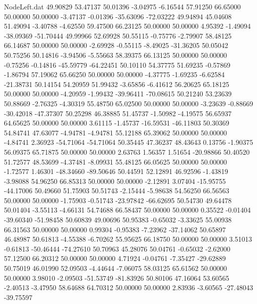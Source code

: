\begin{filecontents}{NodeLeft.dat}
  49.90829   53.47137   50.01396    -3.04975   -6.16544   57.91250   66.65000   50.00000   50.00000   -3.47137   -0.01396  -35.63096  -72.03222
  49.94894   45.04608   51.49094    -3.40788   -4.62550   59.47500   66.23125   50.00000   50.00000    4.95392   -1.49094  -38.09369  -51.70444
  49.99966   52.69928   50.55115    -0.75776   -2.79907   58.48125   66.14687   50.00000   50.00000   -2.69928   -0.55115   -8.49025  -31.36205
  50.05042   50.75256   50.14816    -3.94506   -5.55663   58.39375   66.13125   50.00000   50.00000   -0.75256   -0.14816  -45.59779  -64.22451
  50.10110   54.37775   51.69235    -0.57869   -1.86794   57.19062   65.66250   50.00000   50.00000   -4.37775   -1.69235   -6.62584  -21.38731
  50.14154   54.20959   51.99432    -3.65856   -6.41612   56.20625   65.18125   50.00000   50.00000   -4.20959   -1.99432  -39.96411  -70.08615
  50.21240   53.23639   50.88669    -2.76325   -4.30319   55.48750   65.02500   50.00000   50.00000   -3.23639   -0.88669  -30.42018  -47.37307
  50.25298   46.38885   51.45737    -1.50982   -4.19575   56.65937   64.65625   50.00000   50.00000    3.61115   -1.45737  -16.59531  -46.11803
  50.30369   54.84741   47.63077    -4.94781   -4.94781   55.12188   65.39062   50.00000   50.00000   -4.84741    2.36923  -54.71064  -54.71064
  50.35445   47.36237   48.43643     0.13756   -1.90375   56.09375   65.71875   50.00000   50.00000    2.63763    1.56357    1.51654  -20.98866
  50.40520   51.72577   48.53699    -4.37481   -8.09931   55.48125   66.05625   50.00000   50.00000   -1.72577    1.46301  -48.34660  -89.50646
  50.44591   52.12891   46.92596    -1.43819   -3.98088   54.96250   66.85313   50.00000   50.00000   -2.12891    3.07404  -15.95755  -44.17006
  50.49660   51.75903   50.51743    -2.15444   -5.98638   54.56250   66.56563   50.00000   50.00000   -1.75903   -0.51743  -23.97842  -66.62695
  50.54730   49.64478   50.01404    -3.55113   -4.66131   54.74688   66.58437   50.00000   50.00000    0.35522   -0.01404  -39.60340  -51.98458
  50.60839   49.00696   50.95383    -0.65032   -3.33625   55.00938   66.31563   50.00000   50.00000    0.99304   -0.95383   -7.23962  -37.14062
  50.65897   46.48987   50.61813    -4.55388   -6.70262   55.95625   66.18750   50.00000   50.00000    3.51013   -0.61813  -50.46444  -74.27610
  50.70963   45.28076   50.04761    -0.65032   -2.62000   57.12500   66.20312   50.00000   50.00000    4.71924   -0.04761   -7.35427  -29.62889
  50.75019   46.01990   52.09503    -4.44644   -7.06075   58.03125   65.61562   50.00000   50.00000    3.98010   -2.09503  -51.53749  -81.83926
  50.80106   47.16064   53.60565    -2.40513   -3.47950   58.64688   64.70312   50.00000   50.00000    2.83936   -3.60565  -27.48043  -39.75597

\end{filecontents}
